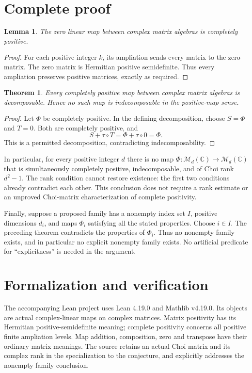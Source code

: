 \documentclass[11pt]{article}
\newtheorem{theorem}{Theorem}
\newtheorem{lemma}{Lemma}
\newcommand{\Mat}{\mathcal M}
\begin{document}
\section{Complete proof}
\begin{lemma}
The zero linear map between complex matrix algebras is completely positive.
\end{lemma}
\begin{proof}
For each positive integer $k$, its ampliation sends every matrix to the zero
matrix. The zero matrix is Hermitian positive semidefinite. Thus every
ampliation preserves positive matrices, exactly as required.
\end{proof}

\newpage
\begin{theorem}
Every completely positive map between complex matrix algebras is
decomposable. Hence no such map is indecomposable in the positive-map sense.
\end{theorem}
\begin{proof}
Let $\Phi$ be completely positive. In the defining decomposition, choose
$S=\Phi$ and $T=0$. Both are completely positive, and
\[
 S+\tau\circ T=\Phi+\tau\circ0=\Phi.
\]
This is a permitted decomposition, contradicting indecomposability.
\end{proof}

In particular, for every positive integer $d$ there is no map
$\Phi:\Mat_d(\mathbb C)\to\Mat_d(\mathbb C)$ that is simultaneously
completely positive, indecomposable, and of Choi rank $d^2-1$. The rank
condition cannot restore existence: the first two conditions already
contradict each other. This conclusion does not require a rank estimate
or an unproved Choi-matrix characterization of complete positivity.

Finally, suppose a proposed family has a nonempty index set $I$, positive
dimensions $d_i$, and maps $\Phi_i$ satisfying all the stated properties.
Choose $i\in I$. The preceding theorem contradicts the properties of
$\Phi_i$. Thus no nonempty family exists, and in particular no explicit
nonempty family exists. No artificial predicate for ``explicitness'' is
needed in the argument.

\section{Formalization and verification}
The accompanying Lean project uses Lean 4.19.0 and Mathlib v4.19.0.
Its objects are actual complex-linear maps on complex matrices. Matrix
positivity has its Hermitian positive-semidefinite meaning; complete
positivity concerns all positive finite ampliation levels. Map addition,
composition, zero and transpose have their ordinary matrix meanings.
The source retains an actual Choi matrix and its complex rank in the
specialization to the conjecture, and explicitly addresses the nonempty
family conclusion.
\end{document}
